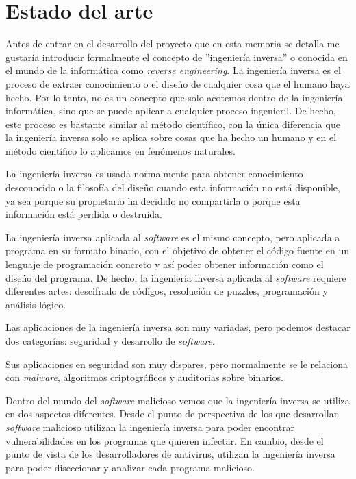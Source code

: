 \chapter{Estado del arte}
\label{cap:estadoDelArte}


Antes de entrar en el desarrollo del proyecto que en esta memoria se detalla me
gustaría introducir formalmente el concepto de ''ingeniería inversa'' o conocida
en el mundo de la informática como \textit{reverse engineering}. La ingeniería
inversa es el proceso de extraer conocimiento o el diseño de cualquier cosa que
el humano haya hecho. Por lo tanto, no es un concepto que solo acotemos dentro de
la ingeniería informática, sino que se puede aplicar a cualquier proceso ingenieril.
De hecho, este proceso es bastante similar al método científico, con la única diferencia
que la ingeniería inversa solo se aplica sobre cosas que ha hecho un humano y en el
método científico lo aplicamos en fenómenos naturales.

La ingeniería inversa es usada normalmente para obtener conocimiento desconocido o la
filosofía del diseño cuando esta información no está disponible, ya sea porque su
propietario ha decidido no compartirla o porque esta información está perdida o
destruida. \cite{alma991003132729706711}

La ingeniería inversa aplicada al \textit{software} es el mismo concepto, pero aplicada
a programa en su formato binario, con el objetivo de obtener el código fuente en un
lenguaje de programación concreto y así poder obtener información como el diseño del
programa. De hecho, la ingeniería inversa aplicada al \textit{software} requiere
diferentes artes: descifrado de códigos, resolución de puzzles, programación y análisis
lógico.

Las aplicaciones de la ingeniería inversa son muy variadas, pero podemos destacar dos
categorías: seguridad y desarrollo de \textit{software}.

Sus aplicaciones en seguridad son muy dispares, pero normalmente se le relaciona con
\textit{malware}, algoritmos criptográficos y auditorias sobre binarios.

Dentro del mundo del \textit{software} malicioso vemos que la ingeniería inversa se
utiliza en dos aspectos diferentes. Desde el punto de perspectiva de los que desarrollan
\textit{software} malicioso utilizan la ingeniería inversa para poder encontrar
vulnerabilidades en los programas que quieren infectar. En cambio, desde el punto de vista
de los desarrolladores de antivirus, utilizan la ingeniería inversa para poder diseccionar
y analizar cada programa malicioso.

